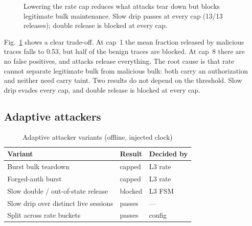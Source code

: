 \documentclass[conference]{IEEEtran}
\begin{document}
\begin{figure}[t]
\centering
{}
\caption{Lowering the rate cap reduces what attacks tear down but blocks legitimate bulk
maintenance. Slow drip passes at every cap (13/13 releases); double release is blocked at
every cap.}
\label{fig:curve}
\end{figure}

Fig.~\ref{fig:curve} shows a clear trade-off. At cap~1 the mean fraction released by
malicious traces falls to 0.53, but half of the benign traces are blocked. At cap~8 there
are no false positives, and attacks release everything. The root cause is that rate cannot
separate legitimate bulk from malicious bulk: both carry an authorization and neither need
carry taint. Two results do not depend on the threshold. Slow drip evades every cap, and
double release is blocked at every cap.

\subsection{Adaptive attackers}

\begin{table}[t]
\centering
\caption{Adaptive attacker variants (offline, injected clock)}
\label{tab:adaptive}
\setlength{\tabcolsep}{3pt}
\begin{tabular}{@{}p{37mm} l l@{}}
\toprule
Variant & Result & Decided by \\
\midrule
Burst bulk teardown & capped & L3 rate \\
Forged-auth burst & capped & L3 rate \\
Slow double / out-of-state release & \textcolor{gwgreen}{blocked} & L3 FSM \\
Slow drip over distinct live sessions & \textcolor{gwred}{passes} & --- \\
Split across rate buckets & \textcolor{gwred}{passes} & config \\
\bottomrule
\end{tabular}
\end{table}
\end{document}
